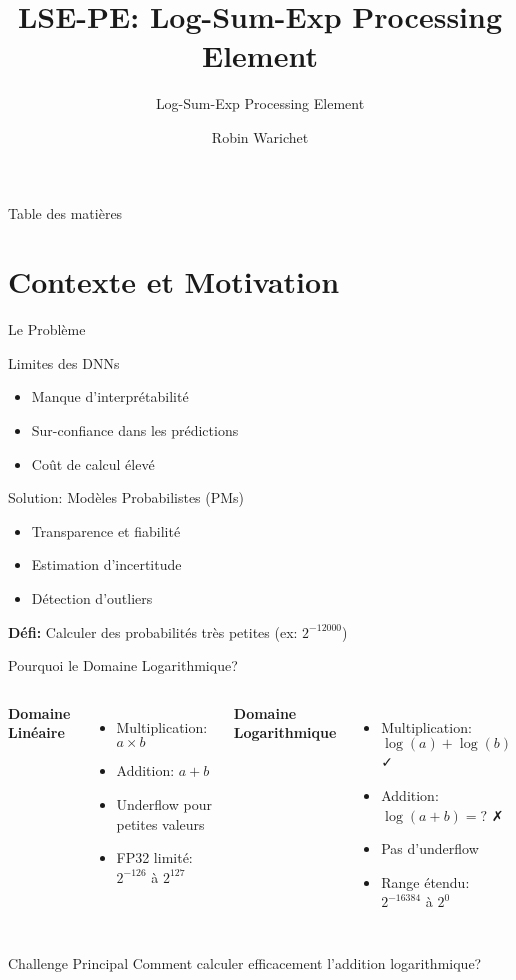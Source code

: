 \documentclass[aspectratio=169]{beamer}
\title{LSE-PE: Log-Sum-Exp Processing Element}
\subtitle{Log-Sum-Exp Processing Element}
\author{Robin Warichet}
\date{}
\begin{document}
\frame{\titlepage}

\begin{frame}{Table des matières}
\tableofcontents
\end{frame}

\section{Contexte et Motivation}

\begin{frame}{Le Problème}
\begin{block}{Limites des DNNs}
\begin{itemize}
\item Manque d'interprétabilité
\item Sur-confiance dans les prédictions
\item Coût de calcul élevé
\end{itemize}
\end{block}

\begin{block}{Solution: Modèles Probabilistes (PMs)}
\begin{itemize}
\item Transparence et fiabilité
\item Estimation d'incertitude
\item Détection d'outliers
\end{itemize}
\end{block}

\vspace{0.3cm}
\textbf{Défi:} Calculer des probabilités très petites (ex: $2^{-12000}$)
\end{frame}

\begin{frame}{Pourquoi le Domaine Logarithmique?}
\begin{columns}
\textbf{Domaine Linéaire}
\begin{itemize}
\item Multiplication: $a \times b$
\item Addition: $a + b$
\item \alert{Underflow} pour petites valeurs
\item FP32 limité: $2^{-126}$ à $2^{127}$
\end{itemize}

\textbf{Domaine Logarithmique}
\begin{itemize}
\item Multiplication: $\log(a) + \log(b)$ ✓
\item Addition: $\log(a + b) = ?$ ✗
\item Pas d'underflow
\item Range étendu: $2^{-16384}$ à $2^0$
\end{itemize}
\end{columns}

\vspace{0.5cm}
\begin{alertblock}{Challenge Principal}
Comment calculer efficacement l'addition logarithmique?
\end{alertblock}
\end{frame}
\end{document}
